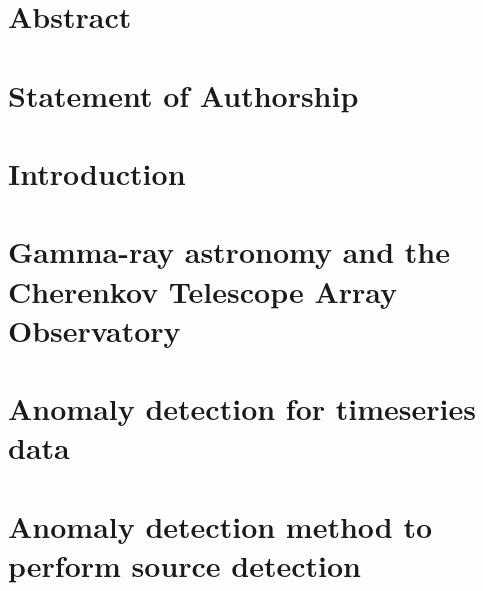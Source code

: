 \documentclass[oneside,openright,titlepage,numbers=noenddot,headinclude,footinclude=true,cleardoublepage=empty,listof=totoc,paper=a4,fontsize=11pt,american,BCOR=5mm]{scrreprt}
\begin{document}
  \frenchspacing
  \raggedbottom
  
  \pagestyle{plain}
  
  \singlespacing
  
  
  
  \onehalfspacing
  
  
  \chapter*{Abstract}
  
  
  \chapter*{Statement of Authorship}
  
  
  
  
  
  
  \cleardoublepage
  \pagestyle{scrheadings}
  \onehalfspacing
  
  \chapter{Introduction}\label{c:Introduction}
   
  \newpage

  \chapter{Gamma-ray astronomy and the Cherenkov Telescope Array Observatory}\label{c:Background-Gamma-Ray-Astronomy}
  
  \newpage
 
  \chapter{Anomaly detection for timeseries data}\label{c:Background-Anomaly-Detection}
  
  \newpage
   
  \chapter{Anomaly detection method to perform source detection}\label{c:Contribution}
   
  \newpage
\end{document}
